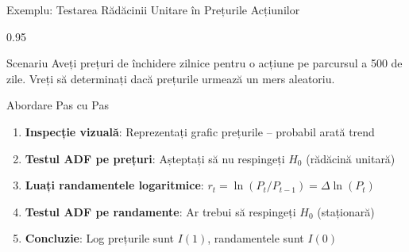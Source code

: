 \documentclass[9pt, aspectratio=169, t]{beamer}
\begin{document}
\begin{frame}{Exemplu: Testarea Rădăcinii Unitare în Prețurile Acțiunilor}
    \begin{cminipage}{0.95\textwidth}
    \begin{block}{Scenariu}
        Aveți prețuri de închidere zilnice pentru o acțiune pe parcursul a 500 de zile. Vreți să determinați dacă prețurile urmează un mers aleatoriu.
    \end{block}

    \vspace{0.3cm}

    \begin{exampleblock}{Abordare Pas cu Pas}
        \begin{enumerate}\setlength{\itemsep}{0pt}
            \item \textbf{Inspecție vizuală}: Reprezentați grafic prețurile -- probabil arată trend
            \item \textbf{Testul ADF pe prețuri}: Așteptați să nu respingeți $H_0$ (rădăcină unitară)
            \item \textbf{Luați randamentele logaritmice}: $r_t = \ln(P_t/P_{t-1}) = \Delta \ln(P_t)$
            \item \textbf{Testul ADF pe randamente}: Ar trebui să respingeți $H_0$ (staționară)
            \item \textbf{Concluzie}: Log prețurile sunt $I(1)$, randamentele sunt $I(0)$
        \end{enumerate}
    \end{exampleblock}
    \end{cminipage}
\end{frame}
\end{document}

